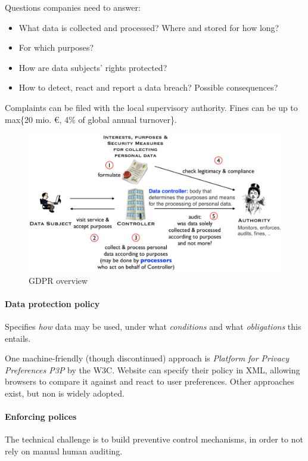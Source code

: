 Questions companies need to answer:
\begin{itemize}
    \item What data is collected and processed? Where and stored for how long?
    \item For which purposes?
    \item How are data subjects' rights protected?
    \item How to detect, react and report a data breach? Possible consequences?
\end{itemize}

Complaints can be filed with the local supervisory authority. Fines can be up to max\{20 mio. \euro, 4\% of global annual turnover\}.

\begin{figure}[h]
    \centering
    \includegraphics[width=13cm]{images/ch12-dp-gdpr.png}
    \caption{GDPR overview}
    \label{fig:dp-gdpr}
\end{figure}

\paragraph{Data protection policy} Specifies \emph{how} data may be used, under what \emph{conditions} and what \emph{obligations} this entails.

One machine-friendly (though discontinued) approach is \emph{Platform for Privacy Preferences P3P} by the W3C. Website can specify their policy in XML, allowing browsers to compare it against and react to user preferences. Other approaches exist, but non is widely adopted.

\paragraph{Enforcing polices}
The technical challenge is to build preventive control mechanisms, in order to not rely on manual human auditing.

